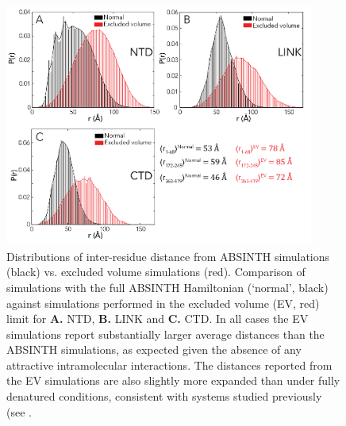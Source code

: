 \documentclass[../main.tex]{subfiles}
\begin{document}
        \begin{figure}[!htb] %
            \centering
            \includegraphics[width=4in]{appendix-e-fig14.png}
            \caption[Distributions of inter-residue distance from ABSINTH simulations vs. excluded volume simulations.]
                {Distributions of inter-residue distance from ABSINTH simulations (black) vs. excluded volume simulations (red). Comparison of simulations with the full ABSINTH Hamiltonian (‘normal’, black) against simulations performed in the excluded volume (EV, red) limit for \textbf{A.} NTD, \textbf{B.} LINK and \textbf{C.} CTD. In all cases the EV simulations report substantially larger average distances than the ABSINTH simulations, as expected given the absence of any attractive intramolecular interactions. The distances reported from the EV simulations are also slightly more expanded than under fully denatured conditions, consistent with systems studied previously (see \cite{Holehouse2020-rl,Meng2013-qi}.}
            \label{fig:appendix-e-fig14}
        \end{figure}
\end{document}
